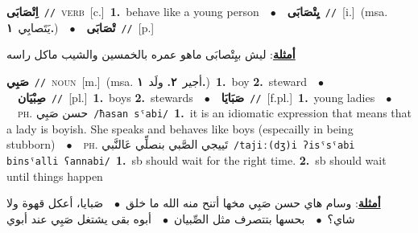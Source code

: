 \documentclass[10pt,a4paper,twoside]{article} %
\begin{document}
\begin{multicols}{2}
{{{{{{{{{\setlength\topsep{0pt}\textbf{\foreignlanguage{arabic}{اِتْصَابَى}}\ {\color{gray}\texttt{//}\color{black}}\ \textsc{verb}\ [c.]\ \textbf{1.}~behave like a young person\ \ $\bullet$\ \ \setlength\topsep{0pt}\textbf{\foreignlanguage{arabic}{يِتْصَابَى}}\ {\color{gray}\texttt{//}\color{black}}\ [i.]\ \color{gray}(msa. \foreignlanguage{arabic}{يَتَصابِي}~\foreignlanguage{arabic}{\textbf{١.}})\color{black}\ \ $\bullet$\ \ \setlength\topsep{0pt}\textbf{\foreignlanguage{arabic}{تْصَابَى}}\ {\color{gray}\texttt{//}\color{black}}\ [p.]\  \begin{flushright}\color{gray}\foreignlanguage{arabic}{\textbf{\underline{\foreignlanguage{arabic}{أمثلة}}}: ليش بيِتْصابَى ماهو عمره بالخمسين والشيب ماكل راسه}\end{flushright}\color{black}} \vspace{2mm}

{\setlength\topsep{0pt}\textbf{\foreignlanguage{arabic}{صَبِي}}\ {\color{gray}\texttt{//}\color{black}}\ \textsc{noun}\ [m.]\ \color{gray}(msa. \foreignlanguage{arabic}{أجير}~\foreignlanguage{arabic}{\textbf{٢.}}  \foreignlanguage{arabic}{ولَد}~\foreignlanguage{arabic}{\textbf{١.}})\color{black}\ \textbf{1.}~boy  \textbf{2.}~steward\ \ $\bullet$\ \ \setlength\topsep{0pt}\textbf{\foreignlanguage{arabic}{صِبْيَان}}\ {\color{gray}\texttt{//}\color{black}}\ [pl.]\ \textbf{1.}~boys  \textbf{2.}~stewards\ \ $\bullet$\ \ \setlength\topsep{0pt}\textbf{\foreignlanguage{arabic}{صَبَايَا}}\ {\color{gray}\texttt{//}\color{black}}\ [f.pl.]\ \textbf{1.}~young ladies\ \ $\bullet$\ \ \textsc{ph.} \color{gray} \foreignlanguage{arabic}{حسن صَبِي}\color{black}\ {\color{gray}\texttt{/{\sffamily ħasan sˤabi}/}\color{black}}\ \textbf{1.}~it is an idiomatic expression that means that a lady is boyish. She speaks and behaves like boys (especailly in being stubborn)\ \ $\bullet$\ \ \textsc{ph.} \color{gray} \foreignlanguage{arabic}{تَييجي الصَّبي بنصلِّي عَالنَّبي}\color{black}\ {\color{gray}\texttt{/{\sffamily tajiː(dʒ)i ʔisˤsˤabi binsˤalli ʕannabi}/}\color{black}}\ \textbf{1.}~sb should wait for the right time.  \textbf{2.}~sb should wait until things happen\  \begin{flushright}\color{gray}\foreignlanguage{arabic}{\textbf{\underline{\foreignlanguage{arabic}{أمثلة}}}: وسام هاي حسن صَبِي مخها أتنح منه الله ما خلق\ $\bullet$\ \  صَبايا، أعكل قهوة ولا شاي؟\ $\bullet$\ \  بحسها بتتصرف مثل الصِّبيان\ $\bullet$\ \  أبوه بقى يشتغل صَبِي عند أبوي}\end{flushright}\color{black}} \vspace{2mm}

}}}}}}}}
\end{multicols}
\end{document}

